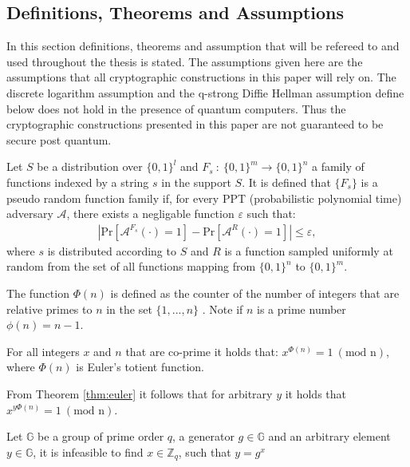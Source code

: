 \subsection*{Definitions, Theorems and Assumptions}
In this section definitions, theorems and assumption that will be refereed to and used throughout the thesis is stated. The assumptions given here are the assumptions that all cryptographic constructions in this paper will rely on. The discrete logarithm assumption and the q-strong Diffie Hellman assumption define below does not hold in the presence of quantum computers. Thus the cryptographic constructions presented in this paper are not  guaranteed to be secure post quantum. 
\vspace{10pt}
\begin{Mydef}
Let $S$ be a  distribution over $\{0,1\}^l$ and $F_s\: :\: \{0,1\}^m\to\{0,1\}^n$ a family of functions indexed by a string $s$ in the support $S$. It is defined that $\{F_s\}$ is a pseudo random function family if, for every PPT (probabilistic polynomial time) adversary $\mathcal{A}$, there exists a negligable function $\varepsilon$ such that:
\begin{align*}
|\text{Pr}[\mathcal{A}^{F_s}(\cdot) = 1] - \text{Pr}[\mathcal{A}^{R}(\cdot) = 1] | \leq \varepsilon,
\end{align*}
where $s$ is distributed according to $S$ and $R$ is a function sampled uniformly at random from the set of all functions mapping from $\{0,1\}^n$ to $\{0,1\}^m$.
\end{Mydef}
\vspace{10pt}
\begin{Mydef}
The function $\Phi(n)$ is defined as the counter of the number of integers that are relative primes to $n$ in the set $\{1,...,n\}$ . Note if $n$ is a prime number $\phi(n) = n-1$.
\end{Mydef}
\vspace{10pt}
\begin{thm}
\label{thm:euler}
For all integers $x$ and $n$ that are co-prime it holds that:
$x^{\Phi(n)} = 1\:( \text{mod n})$, where $\Phi(n)$ is Euler's totient function.
\end{thm}
\vspace{10pt}
From Theorem \ref{thm:euler} it follows that for arbitrary $y$ it holds that $x^{y\Phi(n)} = 1 \:( \text{mod n})$.
\vspace{10pt}

\begin{Ass}
\label{ass:DLA}
Let $\mathds{G}$ be a group of prime order $q$, a generator $g\in \mathds{G}$ and an arbitrary element $y \in\mathds{G}$, it is  infeasible to find $x \in \mathds{Z}_q$, such that $y=g^x$
\end{Ass}

